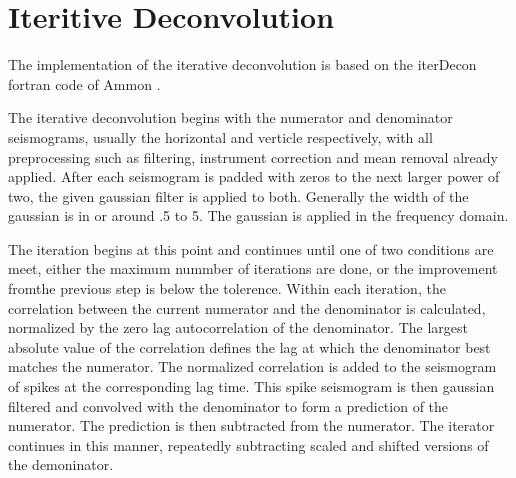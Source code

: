 \documentclass[titlepage]{article}
\begin{document}
\section{Iteritive Deconvolution}

The implementation of the iterative deconvolution is based on the iterDecon fortran code of Ammon \cite{iterdecon}. 

The iterative deconvolution begins with the numerator and denominator seismograms, usually the horizontal and verticle respectively, with all preprocessing such as filtering, instrument correction and mean removal already applied. After each seismogram is padded with zeros to the next larger power of two, the given gaussian filter is applied to both. Generally the width of the gaussian is in or around .5 to 5. The gaussian is applied in the frequency domain.

The iteration begins at this point and continues until one of two conditions are meet, either the maximum nummber of iterations are done, or the improvement fromthe previous step is below the tolerence. Within each iteration, the correlation between the current numerator and the denominator is calculated, normalized by the zero lag autocorrelation of the denominator. The largest absolute value of the correlation defines the lag at which the denominator best matches the numerator. The normalized correlation is added to the seismogram of spikes at the corresponding lag time. This spike seismogram is then gaussian filtered and convolved with the denominator to form a prediction of the numerator. The prediction is then subtracted from the numerator. The iterator continues in this manner, repeatedly subtracting scaled and shifted versions of the demoninator.
\end{document}
